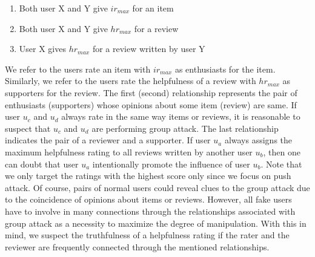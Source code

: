\documentclass[master,english,final]{kaist-ucs}
\begin{document}
\begin{enumerate}
\item Both user X and Y give $ir_{max}$ for an item
\item Both user X and Y give $hr_{max}$ for a review
\item User X gives $hr_{max}$ for a review written by user Y
\end{enumerate}

We refer to the users rate an item with $ir_{max}$ as enthusiasts for the item.
Similarly, we refer to the users rate the helpfulness of a review with $hr_{max}$ as supporters for the review.
The first (second) relationship represents the pair of enthusiasts (supporters) whose opinions about some item (review) are same.
If user $u_c$ and $u_d$ always rate in the same way items or reviews, it is reasonable to suspect that $u_c$ and $u_d$ are performing group attack.
The last relationship indicates the pair of a reviewer and a supporter.
If user $u_a$ always assigns the maximum helpfulness rating to all reviews written by another user $u_b$, then one can doubt that user $u_a$ intentionally promote the influence of user $u_b$.
Note that we only target the ratings with the highest score only since we focus on push attack.
Of course, pairs of normal users could reveal clues to the group attack due to the coincidence of opinions about items or reviews.
However, all fake users have to involve in many connections through the relationships associated with group attack as a necessity to maximize the degree of manipulation.
With this in mind, we suspect the truthfulness of a helpfulness rating if the rater and the reviewer are frequently connected through the mentioned relationships.
\end{document}
